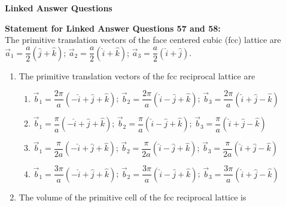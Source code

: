 \documentclass[14pt, a4paper]{extarticle}
\begin{document}
\vspace{1.5em}
\noindent
\textbf{Linked Answer Questions}
\vspace{1em}

\noindent
\textbf{Statement for Linked Answer Questions 57 and 58:} \\
The primitive translation vectors of the face centered cubic (fcc) lattice are
$\vec{a}_1 = \dfrac{a}{2}(\hat{j}+\hat{k})$; $\vec{a}_2 = \dfrac{a}{2}(\hat{i}+\hat{k})$; $\vec{a}_3 = \dfrac{a}{2}(\hat{i}+\hat{j})$.

\begin{enumerate}[label=\textbf{Q. \arabic*}, start=57]

\item The primitive translation vectors of the fcc reciprocal lattice are
\begin{enumerate}
\item $\vec{b}_1 = \dfrac{2\pi}{a}(-\hat{i}+\hat{j}+\hat{k})$; $\vec{b}_2 = \dfrac{2\pi}{a}(\hat{i}-\hat{j}+\hat{k})$; $\vec{b}_3 = \dfrac{2\pi}{a}(\hat{i}+\hat{j}-\hat{k})$
\item $\vec{b}_1 = \dfrac{\pi}{a}(-\hat{i}+\hat{j}+\hat{k})$; $\vec{b}_2 = \dfrac{\pi}{a}(\hat{i}-\hat{j}+\hat{k})$; $\vec{b}_3 = \dfrac{\pi}{a}(\hat{i}+\hat{j}-\hat{k})$
\item $\vec{b}_1 = \dfrac{\pi}{2a}(-\hat{i}+\hat{j}+\hat{k})$; $\vec{b}_2 = \dfrac{\pi}{2a}(\hat{i}-\hat{j}+\hat{k})$; $\vec{b}_3 = \dfrac{\pi}{2a}(\hat{i}+\hat{j}-\hat{k})$
\item $\vec{b}_1 = \dfrac{3\pi}{a}(-\hat{i}+\hat{j}+\hat{k})$; $\vec{b}_2 = \dfrac{3\pi}{a}(\hat{i}-\hat{j}+\hat{k})$; $\vec{b}_3 = \dfrac{3\pi}{a}(\hat{i}+\hat{j}-\hat{k})$
\end{enumerate}

\item The volume of the primitive cell of the fcc reciprocal lattice is
\begin{enumerate}
\end{enumerate}

\end{enumerate}
\end{document}
